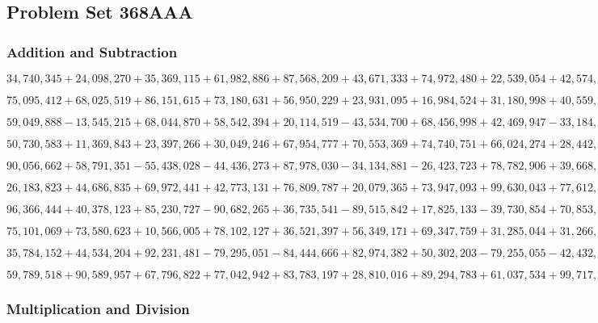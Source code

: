 \hypertarget{problem-set-368aaa}{%
\subsection{Problem Set 368AAA}\label{problem-set-368aaa}}

\hypertarget{addition-and-subtraction}{%
\subsubsection{Addition and
Subtraction}\label{addition-and-subtraction}}

\(34,740,345+24,098,270+35,369,115+61,982,886+87,568,209+43,671,333+74,972,480+22,539,054+42,574,207+88,936,466\)

\(75,095,412+68,025,519+86,151,615+73,180,631+56,950,229+23,931,095+16,984,524+31,180,998+40,559,129+38,793,368\)

\(59,049,888-13,545,215+68,044,870+58,542,394+20,114,519-43,534,700+68,456,998+42,469,947-33,184,419-20,156,846\)

\(50,730,583+11,369,843+23,397,266+30,049,246+67,954,777+70,553,369+74,740,751+66,024,274+28,442,058+93,887,611\)

\(90,056,662+58,791,351-55,438,028-44,436,273+87,978,030-34,134,881-26,423,723+78,782,906+39,668,574+16,238,664\)

\(26,183,823+44,686,835+69,972,441+42,773,131+76,809,787+20,079,365+73,947,093+99,630,043+77,612,318+80,218,326\)

\(96,366,444+40,378,123+85,230,727-90,682,265+36,735,541-89,515,842+17,825,133-39,730,854+70,853,763-82,476,042\)

\(75,101,069+73,580,623+10,566,005+78,102,127+36,521,397+56,349,171+69,347,759+31,285,044+31,266,065+70,770,064\)

\(35,784,152+44,534,204+92,231,481-79,295,051-84,444,666+82,974,382+50,302,203-79,255,055-42,432,578+45,508,242\)

\(59,789,518+90,589,957+67,796,822+77,042,942+83,783,197+28,810,016+89,294,783+61,037,534+99,717,147+46,264,618\)

\hypertarget{multiplication-and-division}{%
\subsubsection{Multiplication and
Division}\label{multiplication-and-division}}

